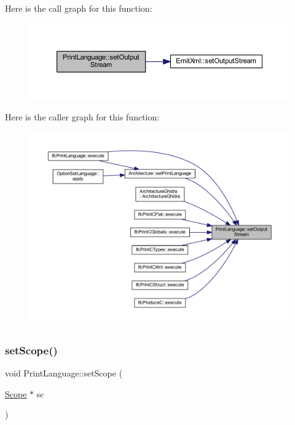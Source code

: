 Here is the call graph for this function\+:
\nopagebreak
\begin{figure}[H]
\begin{center}
\leavevmode
\includegraphics[width=350pt]{class_print_language_ae18d9d88dd9961e1246329051f67df22_cgraph}
\end{center}
\end{figure}
Here is the caller graph for this function\+:
\nopagebreak
\begin{figure}[H]
\begin{center}
\leavevmode
\includegraphics[width=350pt]{class_print_language_ae18d9d88dd9961e1246329051f67df22_icgraph}
\end{center}
\end{figure}
\mbox{\label{class_print_language_a5feab7153a5365d18a0deb5e0e132cba}} 
\subsubsection{\texorpdfstring{setScope()}{setScope()}}
{\footnotesize\ttfamily void Print\+Language\+::set\+Scope (\begin{DoxyParamCaption}\item[{\mbox{\hyperlink{class_scope}{Scope}} $\ast$}]{sc }\end{DoxyParamCaption})\hspace{0.3cm}{\ttfamily [inline]}}



